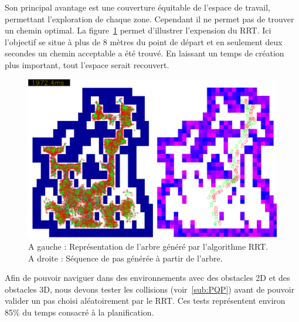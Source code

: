Son principal avantage est une couverture équitable de l'espace de travail, permettant l'exploration de chaque zone. Cependant il ne permet pas de trouver un chemin optimal. La figure~\ref{fig:RRT} permet d'illustrer l'expension du RRT. Ici l'objectif se situe à plus de 8 mètres du point de départ et en seulement deux secondes un chemin acceptable a été trouvé. En laissant un temps de création plus important, tout l'espace serait recouvert.

\begin{figure}[h]
\begin{center}
\includegraphics[width=17.0cm]{images/RRT.png}
\caption{A gauche : Représentation de l'arbre généré par l'algorithme RRT. A droite : Séquence de pas générée à partir de l'arbre.}
\label{fig:RRT}
\end{center}
\end{figure}

Afin de pouvoir naviguer dans des environnements avec des obstacles 2D et des obstacles 3D, nous devons tester les collisions (voir~\ref{sub:PQP}) avant de pouvoir valider un pas choisi aléatoirement par le RRT. Ces tests représentent environ 85\% du temps consacré à la planification.


